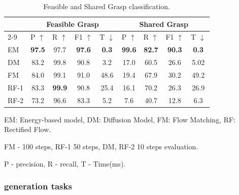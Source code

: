 \begin{table}[!htbp]
\setlength{\tabcolsep}{6pt}
\centering
\caption{Feasible and Shared Grasp classification. }
\label{tab_classificaiton_task}
\begin{threeparttable}
\begin{tabular}{l|cccc|cccc}
\toprule
& \multicolumn{4}{c|}{Feasible Grasp} 
& \multicolumn{4}{c}{Shared Grasp} \\
\cmidrule{2-9}
& P $\uparrow$ & R $\uparrow$  & F1 $\uparrow$  & T $\downarrow$ 
& P $\uparrow$ & R $\uparrow$  & F1 $\uparrow$  & T $\downarrow$ \\
\midrule
EM
&\textbf{97.5}&97.7 &\textbf{97.6} &\phantom{0}\textbf{0.3}
&\textbf{99.6}&\textbf{82.7 }&\textbf{90.3} &\phantom{0}\textbf{0.3}\\
DM
&83.2 &99.8 &90.8 &\phantom{0}3.2
&17.0 &60.5 &26.6 &5.02\\
FM
&84.0 &99.1 &91.0 &48.6
&19.4 &67.9 &30.2 &49.2\\
RF-1
&83.3 &\textbf{99.9} &90.8 &25.4
&16.1 &70.2 &26.3 &26.9 \\
RF-2
&73.2 &96.6 &83.3 &\phantom{0}5.2
&\phantom{0}7.6 &40.7 &12.8 &\phantom{0}6.3 \\
\bottomrule
\end{tabular}

\begin{tablenotes}
  \item[Note 1] EM: Energy-based model, DM: Diffusion Model, FM: Flow Matching, RF: Rectified Flow.
  \item[Note 2] FM - 100 steps, RF-1 50 steps, DM, RF-2 10 steps evaluation.
  \item[Note 3] P - precision, R - recall, T - Time(ms).
\end{tablenotes}
\end{threeparttable}
\end{table}


\subsubsection{generation tasks}


